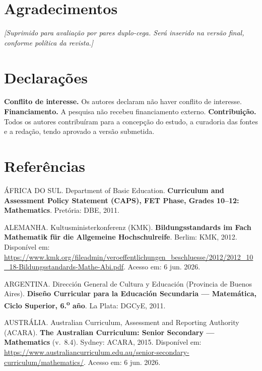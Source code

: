 \documentclass[12pt,a4paper,oneside]{article}
\begin{document}
\section*{Agradecimentos}
\textit{[Suprimido para avaliação por pares duplo-cega. Será inserido na
versão final, conforme política da revista.]}

\section*{Declarações}
\noindent\textbf{Conflito de interesse.} Os autores declaram não haver
conflito de interesse. \textbf{Financiamento.} A pesquisa não recebeu
financiamento externo. \textbf{Contribuição.} Todos os autores
contribuíram para a concepção do estudo, a curadoria das fontes e a
redação, tendo aprovado a versão submetida.

\newpage
\section*{Referências}

\begingroup
{}
\setlength{\parindent}{0pt}
\raggedright
\newcommand{\refitem}[1]{\par #1\par\vspace{12pt}}

\refitem{ÁFRICA DO SUL. Department of Basic Education. \textbf{Curriculum
and Assessment Policy Statement (CAPS), FET Phase, Grades 10--12:
Mathematics}. Pretória: DBE, 2011.}

\refitem{ALEMANHA. Kultusministerkonferenz (KMK). \textbf{Bildungsstandards
im Fach Mathematik für die Allgemeine Hochschulreife}. Berlim: KMK, 2012.
Disponível em:
\url{https://www.kmk.org/fileadmin/veroeffentlichungen_beschluesse/2012/2012_10_18-Bildungsstandards-Mathe-Abi.pdf}.
Acesso em: 6 jun. 2026.}

\refitem{ARGENTINA. Dirección General de Cultura y Educación (Provincia
de Buenos Aires). \textbf{Diseño Curricular para la Educación Secundaria
--- Matemática, Ciclo Superior, 6.\textsuperscript{o} año}. La Plata:
DGCyE, 2011.}

\refitem{AUSTRÁLIA. Australian Curriculum, Assessment and Reporting
Authority (ACARA). \textbf{The Australian Curriculum: Senior Secondary ---
Mathematics} (v.~8.4). Sydney: ACARA, 2015. Disponível em:
\url{https://www.australiancurriculum.edu.au/senior-secondary-curriculum/mathematics/}.
Acesso em: 6 jun. 2026.}
\end{document}
